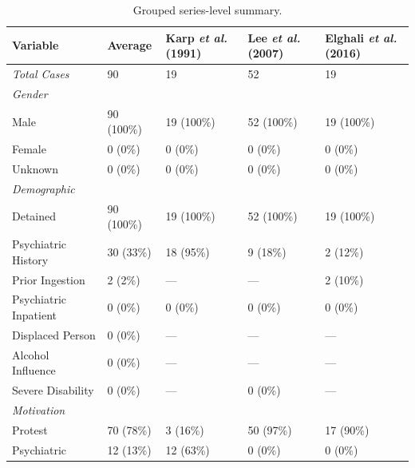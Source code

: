\begin{table}[tb]
\caption{Grouped series-level summary.}
\label{tab:series_results}
\centering
\renewcommand{\arraystretch}{1.2}
\small
\begin{tabular}{p{3cm} p{3cm} p{3cm} p{3cm} p{3cm}}
\toprule
\textbf{Variable} & \textbf{Average} & \textbf{Karp \textit{et al.} (1991) \cite{Karp_1991b}} & \textbf{Lee \textit{et al.} (2007) \cite{Lee_2007}} & \textbf{Elghali \textit{et al.} (2016) \cite{Elghali_2016}} \\
\midrule
\multicolumn{1}{l}{\textit{Total Cases}} & 90 & 19 & 52 & 19 \\
\textit{Gender} & & & & \\
\hspace{1em}Male & 90 (100\%) & 19 (100\%) & 52 (100\%) & 19 (100\%) \\
\hspace{1em}Female & 0 (0\%) & 0 (0\%) & 0 (0\%) & 0 (0\%) \\
\hspace{1em}Unknown & 0 (0\%) & 0 (0\%) & 0 (0\%) & 0 (0\%) \\
\textit{Demographic} & & & & \\
\hspace{1em}Detained & 90 (100\%) & 19 (100\%) & 52 (100\%) & 19 (100\%) \\
\hspace{1em}Psychiatric History & 30 (33\%) & 18 (95\%) & 9 (18\%) & 2 (12\%) \\
\hspace{1em}Prior Ingestion & 2 (2\%) & --- & --- & 2 (10\%) \\
\hspace{1em}Psychiatric Inpatient & 0 (0\%) & 0 (0\%) & 0 (0\%) & 0 (0\%) \\
\hspace{1em}Displaced Person & 0 (0\%) & --- & --- & --- \\
\hspace{1em}Alcohol Influence & 0 (0\%) & --- & --- & --- \\
\hspace{1em}Severe Disability & 0 (0\%) & --- & 0 (0\%) & --- \\
\textit{Motivation} & & & & \\
\hspace{1em}Protest & 70 (78\%) & 3 (16\%) & 50 (97\%) & 17 (90\%) \\
\hspace{1em}Psychiatric & 12 (13\%) & 12 (63\%) & 0 (0\%) & 0 (0\%) \\

\end{tabular}
\end{table}
